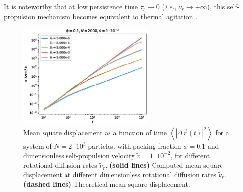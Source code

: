 \documentclass[class=report, float=false, crop=false]{standalone}
\begin{document}
\vspace{-0.4cm}

It is noteworthy that at low persistence time $\tau_r \rightarrow 0$ (\textit{i.e.}, $\nu_r \rightarrow +\infty$), this self-propulsion mechanism becomes equivalent to thermal agitation \cite{fily2014freezing}.\\

\begin{figure}[h!]
\centering
\includegraphics[width=0.6\textwidth]{figures/figs/msd_Dk1000_Vj1000_No2000.eps}
\caption{Mean square displacement as a function of time $\left<|\Delta\vec{r}(t)|^2\right>$ for a system of $N=2\cdot10^3$ particles, with packing fraction $\phi=0.1$ and dimensionless self-propulsion velocity $\tilde{v}=1\cdot10^{-2}$, for different rotational diffusion rates $\tilde{\nu}_r$. \textbf{(solid lines)} Computed mean square displacement at different dimensionless rotational diffusion rates $\tilde{\nu}_r$. \textbf{(dashed lines)} Theoretical mean square displacement.}
\label{msd_ensemble_fit}
\end{figure}
\end{document}
